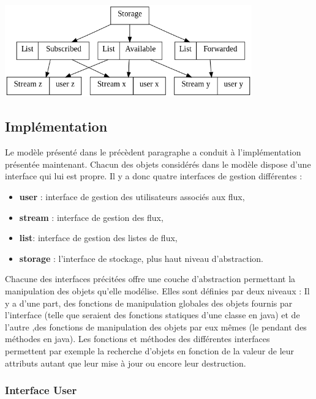 \begin{center}
    \includegraphics[width=0.8\textwidth]{img/struct.png}
\end{center}

\subsection{Implémentation}

Le modèle présenté dans le précèdent paragraphe a conduit à l'implémentation
présentée maintenant. Chacun des objets considérés dans le modèle dispose d'une
interface qui lui est propre. Il y a donc quatre interfaces de gestion différentes : \\

\begin{itemize}
	\item \textbf{user} : interface de gestion des utilisateurs associés aux flux,
	\item \textbf{stream} : interface de gestion des flux,
	\item \textbf{list}:  interface de gestion des listes de flux,
	\item \textbf{storage} : l'interface de stockage, plus haut niveau d'abstraction. \\
\end{itemize}


Chacune des interfaces précitées offre une couche d'abstraction permettant la manipulation
des objets qu'elle modélise. Elles sont définies par deux niveaux : Il y a d'une part, des
fonctions de manipulation globales des objets fournis par l'interface (telle que seraient
des fonctions statiques d'une classe en java) et de l'autre ,des fonctions de manipulation
des objets par eux mêmes (le pendant des méthodes en java). Les fonctions et méthodes des
différentes interfaces permettent par exemple la recherche d'objets en fonction de la valeur
de leur attributs autant que leur mise à jour ou encore leur destruction.

\subsubsection{Interface User}

